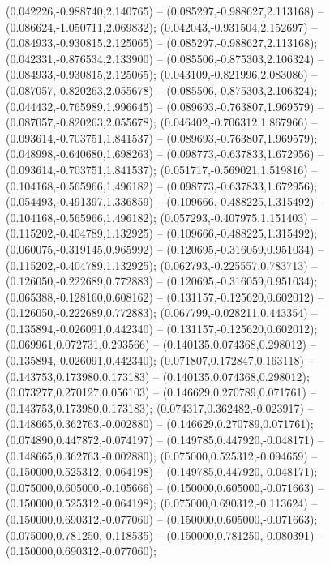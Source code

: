  (0.042226,-0.988740,2.140765) -- (0.085297,-0.988627,2.113168) -- (0.086624,-1.050711,2.069832);
 (0.042043,-0.931504,2.152697) -- (0.084933,-0.930815,2.125065) -- (0.085297,-0.988627,2.113168);
 (0.042331,-0.876534,2.133900) -- (0.085506,-0.875303,2.106324) -- (0.084933,-0.930815,2.125065);
 (0.043109,-0.821996,2.083086) -- (0.087057,-0.820263,2.055678) -- (0.085506,-0.875303,2.106324);
 (0.044432,-0.765989,1.996645) -- (0.089693,-0.763807,1.969579) -- (0.087057,-0.820263,2.055678);
 (0.046402,-0.706312,1.867966) -- (0.093614,-0.703751,1.841537) -- (0.089693,-0.763807,1.969579);
 (0.048998,-0.640680,1.698263) -- (0.098773,-0.637833,1.672956) -- (0.093614,-0.703751,1.841537);
 (0.051717,-0.569021,1.519816) -- (0.104168,-0.565966,1.496182) -- (0.098773,-0.637833,1.672956);
 (0.054493,-0.491397,1.336859) -- (0.109666,-0.488225,1.315492) -- (0.104168,-0.565966,1.496182);
 (0.057293,-0.407975,1.151403) -- (0.115202,-0.404789,1.132925) -- (0.109666,-0.488225,1.315492);
 (0.060075,-0.319145,0.965992) -- (0.120695,-0.316059,0.951034) -- (0.115202,-0.404789,1.132925);
 (0.062793,-0.225557,0.783713) -- (0.126050,-0.222689,0.772883) -- (0.120695,-0.316059,0.951034);
 (0.065388,-0.128160,0.608162) -- (0.131157,-0.125620,0.602012) -- (0.126050,-0.222689,0.772883);
 (0.067799,-0.028211,0.443354) -- (0.135894,-0.026091,0.442340) -- (0.131157,-0.125620,0.602012);
 (0.069961,0.072731,0.293566) -- (0.140135,0.074368,0.298012) -- (0.135894,-0.026091,0.442340);
 (0.071807,0.172847,0.163118) -- (0.143753,0.173980,0.173183) -- (0.140135,0.074368,0.298012);
 (0.073277,0.270127,0.056103) -- (0.146629,0.270789,0.071761) -- (0.143753,0.173980,0.173183);
 (0.074317,0.362482,-0.023917) -- (0.148665,0.362763,-0.002880) -- (0.146629,0.270789,0.071761);
 (0.074890,0.447872,-0.074197) -- (0.149785,0.447920,-0.048171) -- (0.148665,0.362763,-0.002880);
 (0.075000,0.525312,-0.094659) -- (0.150000,0.525312,-0.064198) -- (0.149785,0.447920,-0.048171);
 (0.075000,0.605000,-0.105666) -- (0.150000,0.605000,-0.071663) -- (0.150000,0.525312,-0.064198);
 (0.075000,0.690312,-0.113624) -- (0.150000,0.690312,-0.077060) -- (0.150000,0.605000,-0.071663);
 (0.075000,0.781250,-0.118535) -- (0.150000,0.781250,-0.080391) -- (0.150000,0.690312,-0.077060);
